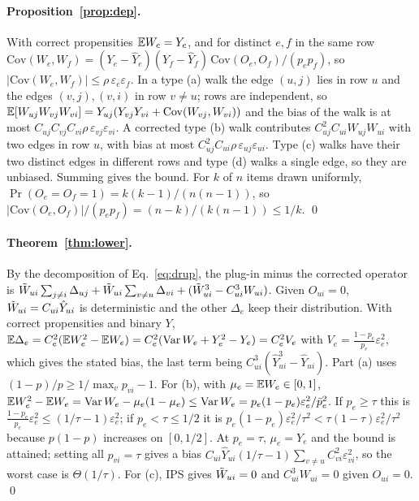 \paragraph{Proposition~\ref{prop:dep}.}
With correct propensities $\mathbb{E} W_e=Y_e$, and for distinct $e,f$ in the same row
$\mathrm{Cov}(W_e,W_f)=(Y_e-\hat Y_e)(Y_f-\hat Y_f)\,\mathrm{Cov}(O_e,O_f)/(p_ep_f)$, so
$|\mathrm{Cov}(W_e,W_f)|\le\rho\,\varepsilon_e\varepsilon_f$. In a type (a) walk the edge $(u,j)$
lies in row $u$ and the edges $(v,j),(v,i)$ in row $v\ne u$; rows are independent,
so $\mathbb{E}[W_{uj}W_{vj}W_{vi}]=Y_{uj}(Y_{vj}Y_{vi}+\mathrm{Cov}(W_{vj},W_{vi}))$ and the bias of
the walk is at most $C_{uj}C_{vj}C_{vi}\rho\,\varepsilon_{vj}\varepsilon_{vi}$. A corrected type (b)
walk contributes $C_{uj}^2C_{ui}W_{uj}W_{ui}$ with two edges in row $u$, with bias
at most $C_{uj}^2C_{ui}\rho\,\varepsilon_{uj}\varepsilon_{ui}$. Type (c) walks have their two
distinct edges in different rows and type (d) walks a single edge, so they are
unbiased. Summing gives the bound. For $k$ of $n$ items drawn uniformly,
$\Pr(O_e=O_f=1)=k(k-1)/(n(n-1))$, so
$|\mathrm{Cov}(O_e,O_f)|/(p_ep_f)=(n-k)/(k(n-1))\le1/k$. \qed

\paragraph{Theorem~\ref{thm:lower}.}
By the decomposition of Eq.~\eqref{eq:drup}, the plug-in minus the corrected
operator is $\tilde W_{ui}\sum_{j\ne i}\Delta_{uj}+\tilde W_{ui}\sum_{v\ne u}\Delta_{vi}+(\tilde W_{ui}^3-C_{ui}^3W_{ui})$.
Given $O_{ui}=0$, $\tilde W_{ui}=C_{ui}\hat Y_{ui}$ is deterministic and the other
$\Delta_e$ keep their distribution. With correct propensities and binary $Y$,
$\mathbb{E}\Delta_e=C_e^2(\mathbb{E} W_e^2-\mathbb{E} W_e)=C_e^2(\operatorname{Var} W_e+Y_e^2-Y_e)=C_e^2V_e$ with
$V_e=\frac{1-p_e}{p_e}\varepsilon_e^2$, which gives the stated bias, the last term being
$C_{ui}^3(\hat Y_{ui}^3-\hat Y_{ui})$. Part (a) uses $(1-p)/p\ge1/\max_vp_{vi}-1$. For
(b), with $\mu_e=\mathbb{E} W_e\in[0,1]$, $\mathbb{E} W_e^2-\mathbb{E} W_e=\operatorname{Var} W_e-\mu_e(1-\mu_e)\le\operatorname{Var} W_e
=p_e(1-p_e)\varepsilon_e^2/\bar p_e^2$. If $p_e\ge\tau$ this is
$\frac{1-p_e}{p_e}\varepsilon_e^2\le(1/\tau-1)\varepsilon_e^2$; if $p_e<\tau\le1/2$ it is
$p_e(1-p_e)\varepsilon_e^2/\tau^2<\tau(1-\tau)\varepsilon_e^2/\tau^2$ because $p(1-p)$ increases on
$[0,1/2]$. At $p_e=\tau$, $\mu_e=Y_e$ and the bound is attained; setting all
$p_{vi}=\tau$ gives a bias $C_{ui}\hat Y_{ui}(1/\tau-1)\sum_{v\ne u}C_{vi}^2\varepsilon_{vi}^2$, so the
worst case is $\Theta(1/\tau)$. For (c), IPS gives $\tilde W_{ui}=0$ and $C_{ui}^3W_{ui}=0$
given $O_{ui}=0$. \qed

